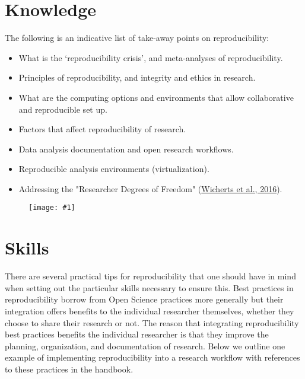 \documentclass{article}
\newlength{\imgwidth}
\newcommand\scaledgraphics[2]{%
                
\settowidth{\imgwidth}{\texttt{[image: \#1]}}%
                
\setlength{\imgwidth}{\minof{\imgwidth}{#2\textwidth}}%
                
\texttt{[image: \#1]}%
                
}
\begin{document}
\section{Knowledge}\label{knowledge}



The following is an indicative list of take-away points on reproducibility:

\begin{itemize}
\item What is the ‘reproducibility crisis’, and meta-analyses of reproducibility.


\item Principles of reproducibility, and integrity and ethics in research.


\item What are the computing options and environments that allow collaborative and reproducible set up.


\item Factors that affect reproducibility of research.


\item Data analysis documentation and open research workflows.


\item Reproducible analysis environments (virtualization).


\item Addressing the "Researcher Degrees of Freedom" (\href{https://doi.org/10/gc5sjn}{Wicherts et al., 2016}).


\end{itemize}
\begin{figure}
\scaledgraphics{965a9b22-10b4-4501-a490-83443a94eafb.png}{1}
\label{F64172361}
\end{figure}


\section{Skills}\label{skills}



There are several practical tips for reproducibility that one should have in mind when setting out the particular skills necessary to ensure this. Best practices in reproducibility borrow from Open Science practices more generally but their integration offers benefits to the individual researcher themselves, whether they choose to share their research or not. The reason that integrating reproducibility best practices benefits the individual researcher is that they improve the planning, organization, and documentation of research. Below we outline one example of implementing reproducibility into a research workflow with references to these practices in the handbook.
\end{document}
